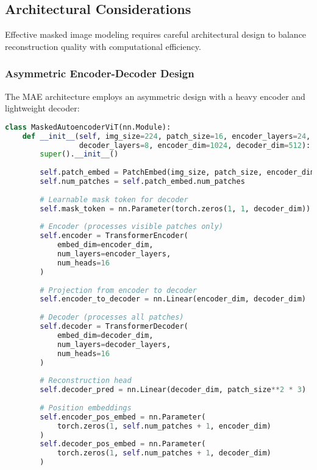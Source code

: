 \subsection{Architectural Considerations}

Effective masked image modeling requires careful architectural design to balance reconstruction quality with computational efficiency.

\subsubsection{Asymmetric Encoder-Decoder Design}

The MAE architecture employs an asymmetric design with a heavy encoder and lightweight decoder:

\begin{lstlisting}[language=Python, caption=Asymmetric MAE architecture implementation]
class MaskedAutoencoderViT(nn.Module):
    def __init__(self, img_size=224, patch_size=16, encoder_layers=24, 
                 decoder_layers=8, encoder_dim=1024, decoder_dim=512):
        super().__init__()
        
        self.patch_embed = PatchEmbed(img_size, patch_size, encoder_dim)
        self.num_patches = self.patch_embed.num_patches
        
        # Learnable mask token for decoder
        self.mask_token = nn.Parameter(torch.zeros(1, 1, decoder_dim))
        
        # Encoder (processes visible patches only)
        self.encoder = TransformerEncoder(
            embed_dim=encoder_dim,
            num_layers=encoder_layers,
            num_heads=16
        )
        
        # Projection from encoder to decoder
        self.encoder_to_decoder = nn.Linear(encoder_dim, decoder_dim)
        
        # Decoder (processes all patches)
        self.decoder = TransformerDecoder(
            embed_dim=decoder_dim,
            num_layers=decoder_layers,
            num_heads=16
        )
        
        # Reconstruction head
        self.decoder_pred = nn.Linear(decoder_dim, patch_size**2 * 3)
        
        # Position embeddings
        self.encoder_pos_embed = nn.Parameter(
            torch.zeros(1, self.num_patches + 1, encoder_dim)
        )
        self.decoder_pos_embed = nn.Parameter(
            torch.zeros(1, self.num_patches + 1, decoder_dim)
        )
    

\end{lstlisting}

